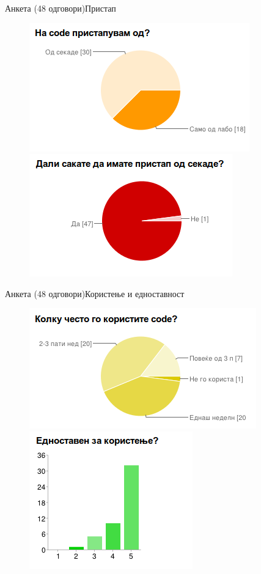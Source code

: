 \begin{frame}{Анкета (48 одговори)}{Пристап}
\begin{figure}
    \centering
      \includegraphics[width=.45\textwidth]{images/responses/pristap}
      \includegraphics[width=.45\textwidth]{images/responses/od_kade}
    \end{figure}
\end{frame}

\begin{frame}{Анкета (48 одговори)}{Користење и едноставност}
\begin{figure}
    \centering
        \includegraphics[width=.45\textwidth]{images/responses/usage}
        \includegraphics[width=.45\textwidth]{images/responses/simple_to_use}
    \end{figure}
\end{frame}

